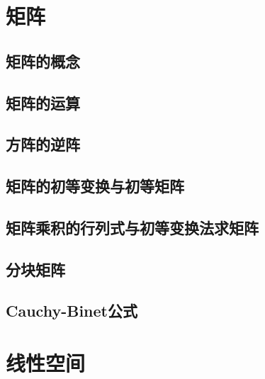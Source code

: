 \documentclass[9pt]{ctexart}
\begin{document}
\section{矩阵}
\subsection{矩阵的概念}
\subsection{矩阵的运算}
\subsection{方阵的逆阵}
\subsection{矩阵的初等变换与初等矩阵}
\subsection{矩阵乘积的行列式与初等变换法求矩阵}
\subsection{分块矩阵}
\subsection{Cauchy-Binet公式}
\section{线性空间}
\end{document}
